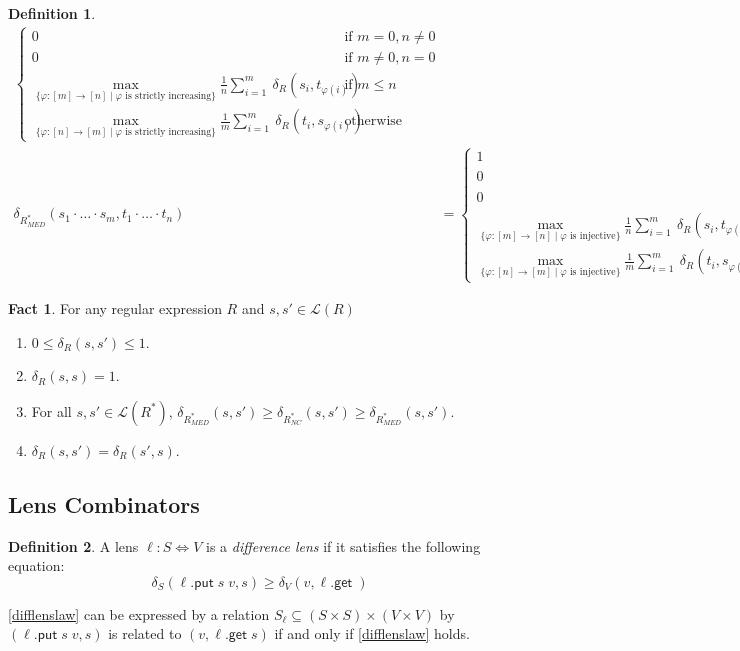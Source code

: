 \documentclass[acmsmall,review,anonymous]{acmart}\settopmatter{printfolios=true,printccs=false,printacmref=false}
\theoremstyle{definition}
\newtheorem{definition}{Definition}
\newtheorem{fact}{Fact}
\newcommand{\kw}[1]{\ensuremath{\mathsf{#1}}\xspace}
\newcommand{\get}{\ensuremath{\kw{get}}\xspace}
\newcommand{\pput}{\ensuremath{\kw{put}}\xspace}
\begin{document}
\begin{definition}
\begin{align*}
\begin{cases}
0 & \text{if } m = 0, n \neq 0\\
0 & \text{if } m \neq 0, n = 0\\
\max\limits_{\{\varphi : [m] \longrightarrow [n] \; | \; \varphi \text{ is strictly increasing}\}}\frac{1}{n}\sum\limits_{i=1}^{m}\ \delta_R(s_i, t_{\varphi(i)})& \text{if } m \leq n\\
\max\limits_{\{\varphi : [n] \longrightarrow [m] \; | \; \varphi \text{ is strictly increasing}\}}\frac{1}{m}\sum\limits_{i=1}^{m}\ \delta_R(t_i, s_{\varphi(i)})& \text{otherwise}
\end{cases}\\
\delta_{R^*_{MED}}(s_1 \cdot \ldots \cdot s_m, t_1 \cdot \ldots \cdot t_n) &= 
\begin{cases}
1 & \text{if } m = 0, n = 0\\ 
0 & \text{if } m = 0, n \neq 0\\
0 & \text{if } m \neq 0, n = 0\\\max\limits_{\{\varphi : [m] \longrightarrow [n] \; | \; \varphi \text{ is injective}\}}\frac{1}{n}\sum\limits_{i=1}^{m}\ \delta_R(s_i, t_{\varphi(i)})& \text{if } m \leq n\\
\max\limits_{\{\varphi : [n] \longrightarrow [m] \; | \; \varphi \text{ is injective}\}}\frac{1}{m}\sum\limits_{i=1}^{m}\ \delta_R(t_i, s_{\varphi(i)})& \text{otherwise}
\end{cases}
\end{align*}
\end{definition}
\begin{fact}
For any regular expression $R$ and $s, s' \in \mathcal{L}(R)$
\begin{enumerate}
\item
$0 \leq \delta_R(s, s') \leq 1$.
\item
$\delta_R(s, s) = 1$.
\item
For all $s, s' \in \mathcal{L}(R^*)$, $\delta_{R^*_{MED}}(s, s') \geq \delta_{R^*_{NC}}(s, s') \geq \delta_{R^*_{MED}}(s, s')$.
\item
$\delta_R(s, s') = \delta_R(s', s)$.
\end{enumerate}

\end{fact}
\subsection{Lens Combinators}
\begin{definition}
A lens $\ell : S \Leftrightarrow V$ is a {\em difference lens} if it satisfies the following equation:
\begin{equation}\label{difflenslaw}
\delta_S(\ell.\pput \; s \;v, s) \geq \delta_V(v, \ell.\get \; )
\end{equation}
\end{definition}
\cref{difflenslaw} can be expressed by a relation $S_{\ell} \subseteq (S \times S) \times (V \times V)$ by $(\ell.\pput \; s \;v, s)$ is related to $(v, \ell.\get \; s)$ if and only if \cref{difflenslaw} holds.
\end{document}
